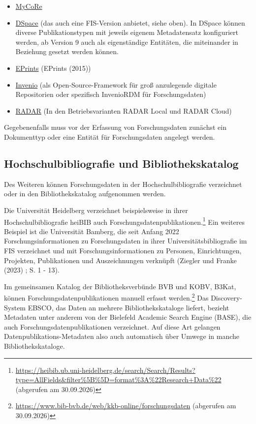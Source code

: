\documentclass[
  ngerman,
  letterpaper,
  DIV=11]{scrreprt}
\providecommand{\tightlist}{%
  \setlength{\itemsep}{0pt}\setlength{\parskip}{0pt}}
\begin{document}
\begin{itemize}
\tightlist
\item
  \href{https://www.mycore.de/en/}{MyCoRe}
\item
  \href{https://dspace.lyrasis.org/}{DSpace} (das auch eine FIS-Version
  anbietet, siehe oben). In DSpace können diverse Publikationstypen mit
  jeweils eigenem Metadatensatz konfiguriert werden, ab Version 9 auch
  als eigenständige Entitäten, die miteinander in Beziehung gesetzt
  werden können.
\item
  \href{https://www.eprints.org/uk/}{EPrints} (EPrints (2015))
\item
  \href{https://inveniosoftware.org/}{Invenio} (als
  Open-Source-Framework für groß anzulegende digitale Repositorien oder
  spezifisch InvenioRDM für Forschungsdaten)
\item
  \href{https://www.fiz-karlsruhe.de/de/produkte-und-dienstleistungen/radar}{RADAR}
  (In den Betriebsvarianten RADAR Local und RADAR Cloud)
\end{itemize}

Gegebenenfalls muss vor der Erfassung von Forschungsdaten zunächst ein
Dokumenttyp oder eine Entität für Forschungsdaten angelegt werden.

\subsection{Hochschulbibliografie und
Bibliothekskatalog}\label{hochschulbibliografie-und-bibliothekskatalog}

Des Weiteren können Forschungsdaten in der Hochschulbibliografie
verzeichnet oder in den Bibliothekskatalog aufgenommen werden.

Die Universität Heidelberg verzeichnet beispielsweise in ihrer
Hochschulbibliografie heiBIB auch
Forschungsdatenpublikationen.\footnote{\url{https://heibib.ub.uni-heidelberg.de/search/Search/Results?type=AllFields&filter\%5B\%5D=format\%3A\%22Research+Data\%22}
  (abgerufen am 30.09.2026)} Ein weiteres Beispiel ist die Universität
Bamberg, die seit Anfang 2022 Forschungsinformationen zu Forschungsdaten
in ihrer Universitätsbibliografie im FIS verzeichnet und mit
Forschungsinformationen zu Personen, Einrichtungen, Projekten,
Publikationen und Auszeichnungen verknüpft (Ziegler und Franke (2023) ;
S. 1 - 13).

Im gemeinsamen Katalog der Bibliotheksverbünde BVB und KOBV, B3Kat,
können Forschungsdatenpublikationen manuell erfasst werden.\footnote{\url{https://www.bib-bvb.de/web/kkb-online/forschungsdaten}
  (abgerufen am 30.09.2026)} Das Discovery-System EBSCO, das Daten an
mehrere Bibliothekskataloge liefert, bezieht Metadaten unter anderem von
der Bielefeld Academic Search Engine (BASE), die auch
Forschungsdatenpublikationen verzeichnet. Auf diese Art gelangen
Datenpublikations-Metadaten also auch automatisch über Umwege in manche
Bibliothekskataloge.
\end{document}
